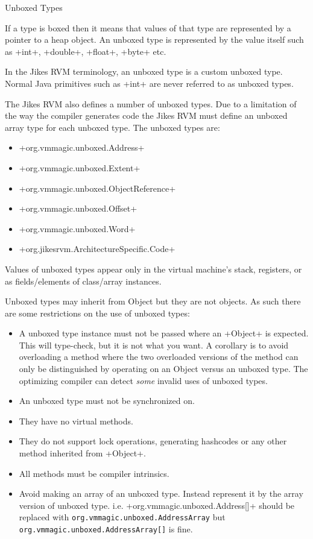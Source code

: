 \begin{section}{Unboxed Types}
\label{sec:unboxedtypes}

If a type is boxed then it means that values of that type are represented by a pointer to a heap object. An unboxed type is represented by the value itself such as \spverb+int+, \spverb+double+, \spverb+float+, \spverb+byte+ etc.

In the Jikes RVM terminology, an unboxed type is a custom unboxed type. Normal Java primitives such as \spverb+int+ are never referred to as unboxed types.

The Jikes RVM also defines a number of unboxed types. Due to a limitation of the way the compiler generates code the Jikes RVM must define an unboxed array type for each unboxed type. The unboxed types are:
\begin{itemize}
  \item \spverb+org.vmmagic.unboxed.Address+
  \item \spverb+org.vmmagic.unboxed.Extent+
  \item \spverb+org.vmmagic.unboxed.ObjectReference+
  \item \spverb+org.vmmagic.unboxed.Offset+
  \item \spverb+org.vmmagic.unboxed.Word+
  \item \spverb+org.jikesrvm.ArchitectureSpecific.Code+
\end{itemize}

Values of unboxed types appear only in the virtual machine's stack, registers, or as fields/elements of class/array instances.

Unboxed types may inherit from Object but they are not objects. As such there are some restrictions on the use of unboxed types:
\begin{itemize}
  \item A unboxed type instance must not be passed where an \spverb+Object+ is expected. This will type-check, but it is not what you want. A corollary is to avoid overloading a method where the two overloaded versions of the method can only be distinguished by operating on an Object versus an unboxed type. The optimizing compiler can detect \textit{some} invalid uses of unboxed types.
  \item An unboxed type must not be synchronized on.
  \item They have no virtual methods.
  \item They do not support lock operations, generating hashcodes or any other method inherited from \spverb+Object+.
  \item All methods must be compiler intrinsics.
  \item  Avoid making an array of an unboxed type. Instead represent it by the array version of unboxed type. i.e. \spverb+org.vmmagic.unboxed.Address[]+ should be replaced with \texttt{org.vm\-ma\-gic.un\-box\-ed.Address\-Ar\-ray} but \texttt{org.vm\-ma\-gic.un\-box\-ed.Address\-Ar\-ray[]} is fine.
\end{itemize}


\end{section}
